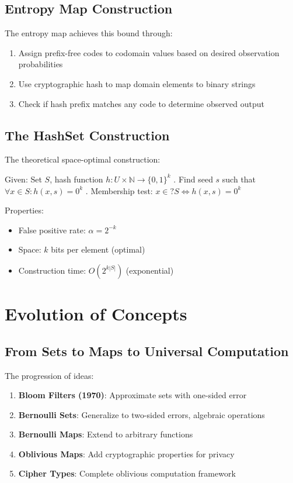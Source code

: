\subsection{Entropy Map Construction}

The entropy map achieves this bound through:
\begin{enumerate}
\item Assign prefix-free codes to codomain values based on desired observation probabilities
\item Use cryptographic hash to map domain elements to binary strings
\item Check if hash prefix matches any code to determine observed output
\end{enumerate}

\subsection{The HashSet Construction}

The theoretical space-optimal construction:
\begin{algorithmic}
\State Given: Set $S$, hash function $h: U \times \mathbb{N} \to \{0,1\}^k$
. Find seed $s$ such that $\forall x \in S: h(x,s) = 0^k$
. Membership test: $x \in? S \Leftrightarrow h(x,s) = 0^k$
\end{algorithmic}

Properties:
\begin{itemize}
\item False positive rate: $\alpha = 2^{-k}$
\item Space: $k$ bits per element (optimal)
\item Construction time: $O(2^{k|S|})$ (exponential)
\end{itemize}

\section{Evolution of Concepts}

\subsection{From Sets to Maps to Universal Computation}

The progression of ideas:
\begin{enumerate}
\item \textbf{Bloom Filters (1970)}: Approximate sets with one-sided error
\item \textbf{Bernoulli Sets}: Generalize to two-sided errors, algebraic operations
\item \textbf{Bernoulli Maps}: Extend to arbitrary functions
\item \textbf{Oblivious Maps}: Add cryptographic properties for privacy
\item \textbf{Cipher Types}: Complete oblivious computation framework
\end{enumerate}

